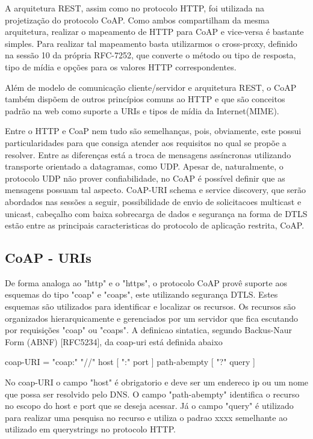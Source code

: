 A arquitetura REST, assim como no protocolo HTTP\cite{rfc2616}, foi utilizada na projetização do protocolo CoAP.
Como ambos compartilham da mesma arquitetura, realizar o mapeamento de HTTP para CoAP e vice-versa é bastante simples.
Para realizar tal mapeamento basta utilizarmos o cross-proxy, definido na sessão 10 da própria RFC-7252\cite{rfc7252},
que converte o método ou tipo de resposta, tipo de mídia e opções para os valores HTTP correspondentes.

Além de modelo de comunicação cliente/servidor e arquitetura REST, o CoAP também dispõem de outros princípios comuns ao HTTP e que são conceitos padrão na web
como suporte a URIs\cite{rfc3986} e tipos de mídia da Internet(MIME)\cite{rfc2046}.

Entre o HTTP e CoaP nem tudo são semelhanças, pois, obviamente, este possui particularidades para que consiga atender aos requisitos no qual se propõe a resolver.
Entre as diferenças está a troca de mensagens assíncronas utilizando transporte orientado a datagramas, como UDP.
Apesar de, naturalmente, o protocolo UDP não prover confiabilidade, no CoAP é possível definir que as mensagens possuam tal aspecto.
CoAP-URI schema e service discovery, que serão abordados nas sessões a seguir, possibilidade de envio de solicitacoes multicast e unicast, cabeçalho com baixa sobrecarga de dados e segurança na forma de DTLS\cite{rfc6347}
estão entre as principais caracteristicas do protocolo de aplicação restrita, CoAP.

\subsection{CoAP - URIs }

De forma analoga ao "http" e o "https", o protocolo CoAP provê suporte aos esquemas do tipo "coap" e "coaps", este utilizando segurança DTLS.
Estes esquemas são utilizados para identificar e localizar os recursos.
Os recursos são organizados hierarquicamente e gerenciados por um servidor que fica escutando por requisições "coap" ou "coaps".
A definicao sintatica, segundo Backus-Naur Form (ABNF) [RFC5234],  da coap-uri está definida abaixo

coap-URI = "coap:" "//" host [ ":" port ] path-abempty [ "?" query ]

No coap-URI o campo "host" é obrigatorio e deve ser um endereco ip ou um nome que possa ser resolvido pelo DNS.
O campo "path-abempty" identifica o recurso no escopo do host e port que se deseja acessar.
Já o campo "query" é utilizado para realizar uma pesquisa no recurso e utiliza o padrao xxxx semelhante ao utilizado em querystrings no protocolo HTTP.

